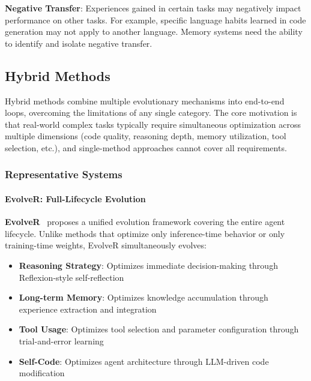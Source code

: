 \textbf{Negative Transfer}: Experiences gained in certain tasks may negatively impact performance on other tasks. For example, specific language habits learned in code generation may not apply to another language. Memory systems need the ability to identify and isolate negative transfer.

\subsection{Hybrid Methods}\label{sec:hybrid}

Hybrid methods combine multiple evolutionary mechanisms into end-to-end loops, overcoming the limitations of any single category. The core motivation is that real-world complex tasks typically require simultaneous optimization across multiple dimensions (code quality, reasoning depth, memory utilization, tool selection, etc.), and single-method approaches cannot cover all requirements.

\subsubsection{Representative Systems}

\paragraph{EvolveR: Full-Lifecycle Evolution}

\textbf{EvolveR}~\citep{evolver2024} proposes a unified evolution framework covering the entire agent lifecycle. Unlike methods that optimize only inference-time behavior or only training-time weights, EvolveR simultaneously evolves:
\begin{itemize}
\item \textbf{Reasoning Strategy}: Optimizes immediate decision-making through Reflexion-style self-reflection
\item \textbf{Long-term Memory}: Optimizes knowledge accumulation through experience extraction and integration
\item \textbf{Tool Usage}: Optimizes tool selection and parameter configuration through trial-and-error learning
\item \textbf{Self-Code}: Optimizes agent architecture through LLM-driven code modification
\end{itemize}

